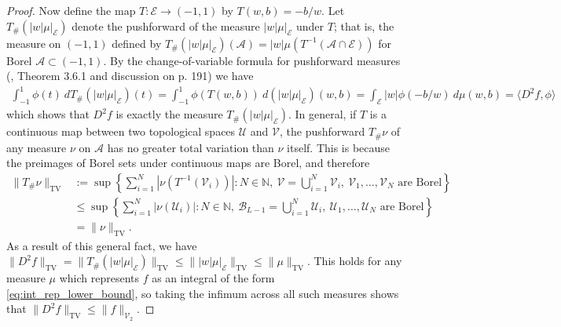 \documentclass{article}
\DeclareMathOperator{\TV}{TV}
\def\cA{{\mathcal{A}}}
\def\cB{{\mathcal{B}}}
\def\cE{{\mathcal{E}}}
\def\cU{{\mathcal{U}}}
\def\cV{{\mathcal{V}}}
\def\bN{{\mathbb{N}}}
\begin{document}
\begin{appendices}
\begin{proof}
Now define the map $T: \cE \to (-1,1)$ by $T(w,b) = -b/w$. Let $T_{\#} (|w| \mu \rvert_{\cE}) $ denote the pushforward of the measure $|w| \mu \rvert_{\cE}$ under $T$; that is, the measure on $(-1,1)$ defined by $T_{\#} (|w| \mu \rvert_{\cE}) (\cA) = |w| \mu(T^{-1}(\cA \cap \cE))$ for Borel $\cA \subset(-1,1)$. By the change-of-variable formula for pushforward measures (\cite{bogachev2007measure}, Theorem 3.6.1 and discussion on p. 191) we have
\begin{align}
     \int_{-1}^1 \phi(t) \ dT_{\#} (|w| \mu \rvert_{\cE})(t) = \int_{-1}^1 \phi(T(w,b)) \ d (|w| \mu \rvert_{\cE})(w,b) = \int_{\cE} |w| \phi(-b/w) \ d \mu(w,b) = \langle D^2 f, \phi \rangle
\end{align}
which shows that $D^2 f$ is exactly the measure $T_{\#} (|w| \mu \rvert_{\cE})$. In general, if $T$ is a continuous map between two topological spaces $\cU$ and $\cV$, the pushforward $T_{\#} \nu$ of any measure $\nu$ on $\cA$ has no greater total variation than $\nu$ itself. This is because the preimages of Borel sets under continuous maps are Borel, and therefore
\begin{align}
     \| T_{\#} \nu \|_{\TV} &:= \sup \left\{ \sum_{i=1}^N |\nu(T^{-1}(\cV_i))|: N \in \bN, \  \cV= \bigcup_{i=1}^N \cV_i, \ \textrm{$\cV_1, \dots, \cV_N$ are Borel} \right\} \\
     &\leq \sup \left\{ \sum_{i=1}^N |\nu(\cU_i)|: N \in \bN, \  \cB_{L-1} = \bigcup_{i=1}^N \cU_i, \ \textrm{$\cU_1, \dots, \cU_N$ are Borel} \right\} \\
     &= \| \nu \|_{\TV}.
 \end{align}
As a result of this general fact, we have $\| D^2 f \|_{\TV} = \| T_{\#} (|w| \mu \rvert_{\cE}) \|_{\TV} \leq \| |w| \mu \rvert_{\cE} \|_{\TV} \leq \| \mu \|_{\TV}$. This holds for any measure $\mu$ which represents $f$ as an integral of the form \eqref{eq:int_rep_lower_bound}, so taking the infimum across all such measures shows that $\| D^2 f \|_{\TV} \leq \| f \|_{\cV_2}$.
\end{proof}



\end{appendices}
\end{document}
